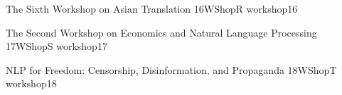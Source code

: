 \begin{wsschedule}
 {The Sixth Workshop on Asian Translation}
 {16}{WShopR}
 {workshop16}
 {\WShopLocR}
 
\end{wsschedule}

\begin{wsschedule}
 {The Second Workshop on Economics and Natural Language Processing}
 {17}{WShopS}
 {workshop17}
 {\WShopLocS}
 
\end{wsschedule}

\begin{wsschedule}
 {NLP for Freedom: Censorship, Disinformation, and Propaganda}
 {18}{WShopT}
 {workshop18}
 {\WShopLocT}
 
\end{wsschedule}
 
\clearpage{\thispagestyle{emptyheader}\cleardoublepage}

